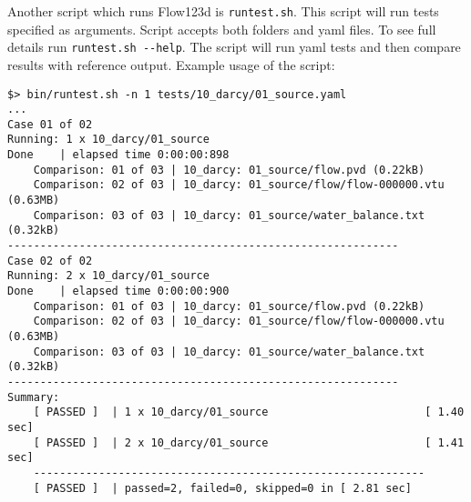 Another script which runs Flow123d is \verb'runtest.sh'. This script will run tests specified as arguments. Script accepts both folders
and yaml files. To see full details run \verb'runtest.sh --help'. The script will run yaml tests and then compare results with reference
output. Example usage of the script:

\begin{verbatim}
$> bin/runtest.sh -n 1 tests/10_darcy/01_source.yaml 
...
Case 01 of 02
Running: 1 x 10_darcy/01_source
Done    | elapsed time 0:00:00:898                                              
    Comparison: 01 of 03 | 10_darcy: 01_source/flow.pvd (0.22kB)
    Comparison: 02 of 03 | 10_darcy: 01_source/flow/flow-000000.vtu (0.63MB)
    Comparison: 03 of 03 | 10_darcy: 01_source/water_balance.txt (0.32kB)
------------------------------------------------------------
Case 02 of 02
Running: 2 x 10_darcy/01_source
Done    | elapsed time 0:00:00:900                                              
    Comparison: 01 of 03 | 10_darcy: 01_source/flow.pvd (0.22kB)
    Comparison: 02 of 03 | 10_darcy: 01_source/flow/flow-000000.vtu (0.63MB)
    Comparison: 03 of 03 | 10_darcy: 01_source/water_balance.txt (0.32kB)
------------------------------------------------------------
Summary: 
    [ PASSED ]  | 1 x 10_darcy/01_source                        [ 1.40 sec] 
    [ PASSED ]  | 2 x 10_darcy/01_source                        [ 1.41 sec] 
    ------------------------------------------------------------
    [ PASSED ]  | passed=2, failed=0, skipped=0 in [ 2.81 sec]

\end{verbatim}
